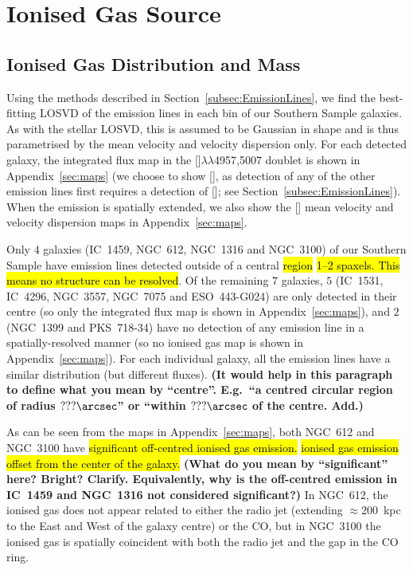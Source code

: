 \documentclass[a4paper,fleqn,usenatbib]{mnras}
\DeclareRobustCommand{\removed}[1]{{\sethlcolor{red}\hl{#1}}}
\DeclareRobustCommand{\added}[1]{{\sethlcolor{green}\hl{#1}}}
\begin{document}
\section{Ionised Gas Source}
\label{sec:gas}

\subsection{Ionised Gas Distribution and Mass}
\label{subsec:gas_mass}

Using the methods described in Section~\ref{subsec:EmissionLines}, we
find the best-fitting LOSVD of the emission lines in each bin of our
Southern Sample galaxies. As with the stellar LOSVD, this is assumed
to be Gaussian in shape and is thus parametrised by the mean velocity
and velocity dispersion only. For each detected galaxy, the integrated
flux map in the []$\lambda\lambda$4957,5007 doublet is
shown in Appendix~\ref{sec:maps} (we choose to show [], as
detection of any of the other emission lines first requires a
detection of []; see
Section~\ref{subsec:EmissionLines}). When the emission is spatially
extended, we also show the [] mean velocity and velocity
dispersion maps in Appendix~\ref{sec:maps}.

Only $4$ galaxies (IC~1459, NGC~612, NGC~1316 and NGC~3100) of our
Southern Sample have emission lines detected outside of a central
\removed{region} \added{1--2 spaxels. This means no structure can be
 resolved}. Of the remaining $7$ galaxies, $5$ (IC~1531, IC~4296,
NGC~3557, NGC~7075 and ESO~443-G024) are only detected in their centre
(so only the integrated flux map is shown in Appendix~\ref{sec:maps}),
and $2$ (NGC~1399 and PKS~718-34) have no detection of any emission
line in a spatially-resolved manner (so no ionised gas map is shown in
Appendix~\ref{sec:maps}). For each individual galaxy, all the emission
lines have a similar distribution (but different fluxes). {\bf (It
  would help in this paragraph to define what you mean by
  ``centre''. E.g.\ ``a centred circular region of radius
  $???\arcsec$'' or ``within $???\arcsec$ of the centre. Add.)}

As can be seen from the maps in Appendix~\ref{sec:maps}, 
both NGC~612 and NGC~3100 have \removed{significant off-centred ionised 
gas emission.} \added{ionised gas emission offset from the center of the 
galaxy.} {\bf (What do you mean by ``significant'' here? Bright?
  Clarify. Equivalently, why is the off-centred emission in IC~1459
  and NGC~1316 not considered significant?)} In NGC~612, 
the ionised gas does not appear related to either the radio jet 
(extending $\approx200$~kpc to the East and West of the galaxy 
centre) or the CO, but in NGC~3100 the ionised gas is spatially 
coincident with both the radio jet and the gap in the CO ring.
\end{document}

